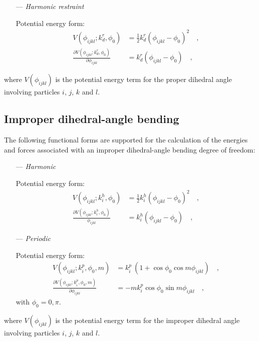 \documentclass[10pt,a4paper,openany]{memoir}
\numberwithin{equation}{section}
\begin{document}
\begin{itemize}
\item [---]\textit{Harmonic restraint}
  \par
  Potential energy form:
  \begin{align}
  \label{eq:proper-restraint-energy}
  V(\phi_{ijkl}; k_d^r, \phi_0) & = \frac{1}{2} k_d^r (\phi_{ijkl} - \phi_0)^2 \quad , \\ \nonumber
  \frac{\partial V(\phi_{ijkl}; k_d^r, \phi_0)}{\partial \phi_{ijkl}} & = k_d^r (\phi_{ijkl} - \phi_0) \quad , 
\end{align}
\end{itemize}
where $V(\phi_{ijkl})$ is the potential energy term for the proper dihedral angle involving particles $i$, $j$, $k$ and $l$.

\subsection{Improper dihedral-angle bending}
\label{sec:improper-terms}

The following functional forms are supported for the calculation of
the energies and forces associated with an improper dihedral-angle
bending degree of freedom:\cite{GROMOS-doc,GROMACS-doc}

\begin{itemize}
\item[---] \textit{Harmonic}
  \par
  Potential energy form:  
\begin{align}
  \label{eq:improper-harmonic-energy}
  V(\phi_{ijkl}; k_i^h, \phi_0) & =  \frac{1}{2} k_i^h (\phi_{ijkl} - \phi_0)^2 \quad , \\ \nonumber
  \frac{\partial V(\phi_{ijkl}; k_i^h, \phi_0)}{\phi_{ijkl}} & = k_i^h (\phi_{ijkl} - \phi_0) \quad ,
\end{align}
\item [---] \textit{Periodic}
  \par
  Potential energy form:
  \begin{align}
    \label{eq:improper-periodic-energy}
    V(\phi_{ijkl} ; k_{i}^p, \phi_{0}, m) & = k_{i}^p\ (1 + \cos{\phi_{0}} \cos{m \phi_{ijkl}})\quad , \\ \nonumber
    \frac{\partial V(\phi_{ijkl} ; k_{i}^p, \phi_{0}, m)}{\partial \phi_{ijkl}} & = -m k_{i}^p \cos{\phi_{0}} \sin{m \phi_{ijkl}}\quad ,
  \end{align}
  with $\phi_{0}=0,\pi$.
 \end{itemize}
 where $V(\phi_{ijkl})$ is the potential energy term for the improper dihedral angle involving particles $i$, $j$, $k$ and $l$.
\end{document}
